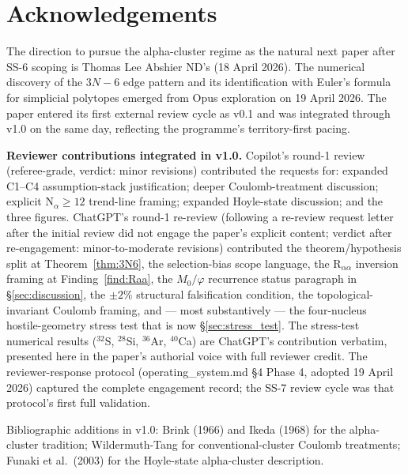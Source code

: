 \documentclass[11pt,letterpaper]{article}
\begin{document}
\section*{Acknowledgements}

The direction to pursue the alpha-cluster regime as the natural next paper after SS-6 scoping is Thomas Lee Abshier ND's (18 April 2026). The numerical discovery of the $3N - 6$ edge pattern and its identification with Euler's formula for simplicial polytopes emerged from Opus exploration on 19 April 2026. The paper entered its first external review cycle as v0.1 and was integrated through v1.0 on the same day, reflecting the programme's territory-first pacing.

\textbf{Reviewer contributions integrated in v1.0.} Copilot's round-1 review (referee-grade, verdict: minor revisions) contributed the requests for: expanded C1--C4 assumption-stack justification; deeper Coulomb-treatment discussion; explicit N$_\alpha \geq 12$ trend-line framing; expanded Hoyle-state discussion; and the three figures. ChatGPT's round-1 re-review (following a re-review request letter after the initial review did not engage the paper's explicit content; verdict after re-engagement: minor-to-moderate revisions) contributed the theorem/hypothesis split at Theorem~\ref{thm:3N6}, the selection-bias scope language, the R$_{\alpha\alpha}$ inversion framing at Finding~\ref{find:Raa}, the $M_0/\varphi$ recurrence status paragraph in \S\ref{sec:discussion}, the $\pm 2\%$ structural falsification condition, the topological-invariant Coulomb framing, and --- most substantively --- the four-nucleus hostile-geometry stress test that is now \S\ref{sec:stress_test}. The stress-test numerical results (${}^{32}$S, ${}^{28}$Si, ${}^{36}$Ar, ${}^{40}$Ca) are ChatGPT's contribution verbatim, presented here in the paper's authorial voice with full reviewer credit. The reviewer-response protocol (operating\_system.md \S 4 Phase 4, adopted 19 April 2026) captured the complete engagement record; the SS-7 review cycle was that protocol's first full validation.

Bibliographic additions in v1.0: Brink (1966) and Ikeda (1968) for the alpha-cluster tradition; Wildermuth-Tang for conventional-cluster Coulomb treatments; Funaki et al.\ (2003) for the Hoyle-state alpha-cluster description.
\end{document}

